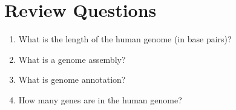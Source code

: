 \documentclass[]{book}
\providecommand{\tightlist}{%
  \setlength{\itemsep}{0pt}\setlength{\parskip}{0pt}}
\begin{document}
\hypertarget{review-questions-11}{%
\section{Review Questions}\label{review-questions-11}}

\begin{enumerate}
\def\labelenumi{\arabic{enumi}.}
\tightlist
\item
  What is the length of the human genome (in base pairs)?
\item
  What is a genome assembly?
\item
  What is genome annotation?
\item
  How many genes are in the human genome?
\end{enumerate}
\end{document}
